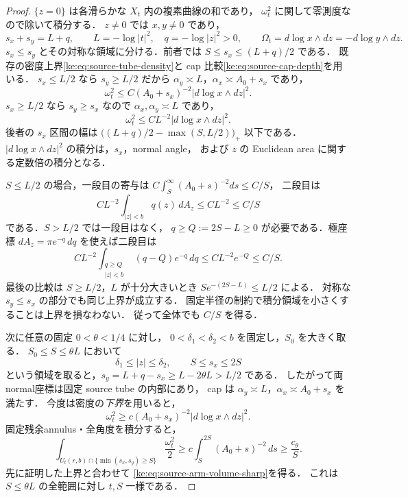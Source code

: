 \begin{proof}
$\{z=0\}$ は各滑らかな $X_t$ 内の複素曲線の和であり，
$\omega_t^2$ に関して零測度なので除いて積分する．
$z\ne0$ では $x,y\ne0$ であり，
\[
 s_x+s_y=L+q,\qquad
 L=-\log|t|^2,\quad q=-\log|z|^2>0,\qquad
 \Omega_t=d\log x\wedge dz=-d\log y\wedge dz.
\]
$s_x\le s_y$ とその対称な領域に分ける．前者では
$S\le s_x\le(L+q)/2$ である．
既存の密度上界\eqref{ke:eq:source-tube-density}と
cap 比較\eqref{ke:eq:source-cap-depth}を用いる．
$s_x\le L/2$ なら $s_y\ge L/2$ だから
$\alpha_y\asymp L$，$\alpha_x\asymp A_0+s_x$ であり，
\[
 \omega_t^2\le C(A_0+s_x)^{-2}|d\log x\wedge dz|^2.
\]
$s_x\ge L/2$ なら $s_y\ge s_x$ なので
$\alpha_x,\alpha_y\asymp L$ であり，
\[
 \omega_t^2\le CL^{-2}|d\log x\wedge dz|^2.
\]
後者の $s_x$ 区間の幅は
$\bigl((L+q)/2-\max(S,L/2)\bigr)_+$ 以下である．
$|d\log x\wedge dz|^2$ の積分は，$s_x$，normal angle，
および $z$ の Euclidean area に関する定数倍の積分となる．

$S\le L/2$ の場合，一段目の寄与は
$C\int_S^\infty(A_0+s)^{-2}ds\le C/S$，
二段目は
\[
 CL^{-2}\int_{|z|<b}q(z)\,dA_z\le CL^{-2}\le C/S
\]
である．$S>L/2$ では一段目はなく，
$q\ge Q:=2S-L\ge0$ が必要である．極座標
$dA_z=\pi e^{-q}\,dq$ を使えば二段目は
\[
 CL^{-2}\int_{\substack{q\ge Q\\|z|<b}}(q-Q)e^{-q}\,dq
 \le CL^{-2}e^{-Q}\le C/S.
\]
最後の比較は $S\ge L/2$，$L$ が十分大きいとき
$S e^{-(2S-L)}\le L/2$ による．
対称な $s_y\le s_x$ の部分でも同じ上界が成立する．
固定半径の制約で積分領域を小さくすることは上界を損なわない．
従って全体でも $C/S$ を得る．

次に任意の固定 $0<\theta<1/4$ に対し，
$0<\delta_1<\delta_2<b$ を固定し，$S_0$ を大きく取る．
$S_0\le S\le\theta L$ において
\[
 \delta_1\le|z|\le\delta_2,\qquad S\le s_x\le2S
\]
という領域を取ると，$s_y=L+q-s_x\ge L-2\theta L>L/2$ である．
したがって両normal座標は固定 source tube の内部にあり，
cap は $\alpha_y\asymp L$，$\alpha_x\asymp A_0+s_x$ を満たす．
今度は密度の\emph{下界}を用いると，
\[
 \omega_t^2\ge c(A_0+s_x)^{-2}|d\log x\wedge dz|^2.
\]
固定残余annulus・全角度を積分すると，
\[
 \int_{U_t(r,b)\cap\{\min(s_x,s_y)\ge S\}}
 \frac{\omega_t^2}{2}
 \ge c\int_S^{2S}(A_0+s)^{-2}\,ds\ge\frac{c_\theta}{S}.
\]
先に証明した上界と合わせて
\eqref{ke:eq:source-arm-volume-sharp}を得る．
これは $S\le\theta L$ の全範囲に対し $t,S$ 一様である．


\end{proof}
